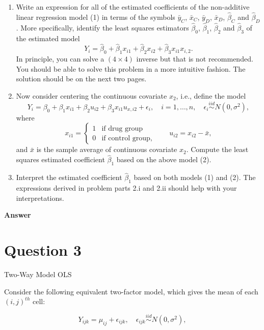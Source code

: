 \documentclass[letterpaper]{article}
\begin{document}
\begin{enumerate}
	\item Write an expression for all of the estimated coefficients of the non-additive linear regression model (1) in terms of the symbols $\bar{y}_C$, $\bar{x}_C$, $\bar{y}_D$, $\bar{x}_D$, $\hat{\beta}_C$ and $\hat{\beta}_D$. More specifically, identify the least squares estimators $\hat{\beta}_0$, $\hat{\beta}_1$, $\hat{\beta}_2$ and $\hat{\beta}_3$ of the estimated model
	\[
	Y_i = \hat{\beta}_0 + \hat{\beta}_1 x_{i1} + \hat{\beta}_2 x_{i2} + \hat{\beta}_3 x_{i1} x_{i,2}.
	\]
	In principle, you can solve a $(4 \times 4)$ inverse but that is not recommended. You should be able to solve this problem in a more intuitive fashion. The solution should be on the next two pages.
	
	\item Now consider centering the continuous covariate $x_2$, i.e., define the model
	\begin{equation}
		Y_i = \beta_0 + \beta_1 x_{i1} + \beta_2 u_{i2} + \beta_3 x_{i1} u_{x,i2} + \epsilon_i, \quad i = 1, \ldots, n, \quad \epsilon_i \overset{iid}{\sim} N(0, \sigma^2),
	\end{equation}
	where
	\[
	x_{i1} = \begin{cases} 1 & \text{if drug group} \\ 0 & \text{if control group,} \end{cases} \qquad u_{i2} = x_{i2} - \bar{x},
	\]
	and $\bar{x}$ is the sample average of continuous covariate $x_2$. Compute the least squares estimated coefficient $\hat{\beta}_1$ based on the above model (2).
	
	\item Interpret the estimated coefficient $\hat{\beta}_1$ based on both models (1) and (2). The expressions derived in problem parts 2.i and 2.ii should help with your interpretations.
\end{enumerate}
	
	\textbf{Answer}
	
	\clearpage
	
	\section{Question 3}
	
	{\color{deepred}  Two-Way Model OLS}
	
	Consider the following equivalent two-factor model, which gives the mean of each $(i, j)^{th}$ cell:
	
	\begin{equation}
		Y_{ijk} = \mu_{ij} + \epsilon_{ijk}, \quad \epsilon_{ijk} \overset{iid}{\sim} N(0, \sigma^2),
	\end{equation}
	
\end{document}
